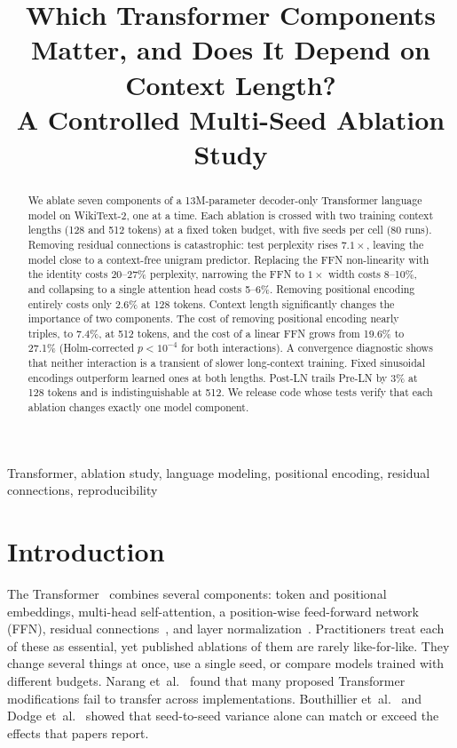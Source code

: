 \documentclass[conference]{IEEEtran}
\begin{document}
\title{Which Transformer Components Matter, and Does It Depend on Context Length?\\
A Controlled Multi-Seed Ablation Study}

\author{
}

\maketitle

\begin{abstract}
We ablate seven components of a 13M-parameter decoder-only Transformer language model on
WikiText-2, one at a time. Each ablation is crossed with two training context lengths
(128 and 512 tokens) at a fixed token budget, with five seeds per cell (80 runs).
Removing residual connections is catastrophic: test perplexity rises $7.1\times$, leaving the
model close to a context-free unigram predictor. Replacing the FFN non-linearity with the identity
costs 20--27\% perplexity, narrowing the FFN to $1\times$ width costs 8--10\%, and collapsing to a
single attention head costs 5--6\%. Removing positional encoding entirely costs only 2.6\% at
128 tokens. Context length significantly changes the importance of two components. The cost of
removing positional encoding nearly triples, to 7.4\%, at 512 tokens, and the cost of a linear
FFN grows from 19.6\% to 27.1\% (Holm-corrected $p<10^{-4}$ for both interactions). A convergence
diagnostic shows that neither interaction is a transient of slower long-context training. Fixed
sinusoidal encodings outperform learned ones at both lengths. Post-LN trails Pre-LN by 3\% at
128 tokens and is indistinguishable at 512. We release code whose tests verify that each ablation
changes exactly one model component.
\end{abstract}

\begin{IEEEkeywords}
Transformer, ablation study, language modeling, positional encoding, residual connections, reproducibility
\end{IEEEkeywords}

\section{Introduction}

The Transformer~\cite{vaswani2017attention} combines several components: token and positional
embeddings, multi-head self-attention, a position-wise feed-forward network (FFN), residual
connections~\cite{he2016deep}, and layer normalization~\cite{ba2016layer}. Practitioners treat
each of these as essential, yet published ablations of them are rarely like-for-like. They
change several things at once, use a single seed, or compare models trained with different
budgets. Narang et~al.~\cite{narang2021transformer} found that many proposed Transformer
modifications fail to transfer across implementations. Bouthillier et~al.~\cite{bouthillier2021accounting}
and Dodge et~al.~\cite{dodge2020fine} showed that seed-to-seed variance alone can match or exceed
the effects that papers report.
\end{document}
